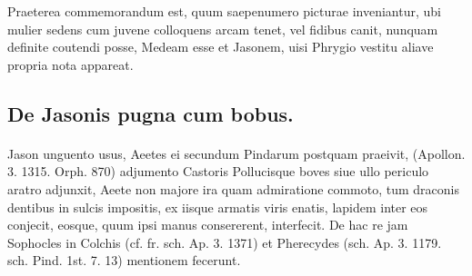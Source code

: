 \documentclass[landscape, a4paper, 11pt, oneside, polutonikogreek, german]{article}
\begin{document}
Praeterea commemorandum est, quum saepenumero picturae inveniantur, ubi mulier sedens cum juvene colloquens arcam tenet, vel fidibus canit, nunquam definite coutendi posse, Medeam esse et Jasonem, uisi Phrygio vestitu aliave propria nota appareat.

\subsection{De Jasonis pugna cum bobus.}
\paragraph{}
Jason unguento usus, Aeetes ei secundum Pindarum postquam praeivit, (Apollon. 3. 1315. Orph. 870) adjumento Castoris Pollucisque boves siue ullo periculo aratro adjunxit, Aeete non majore ira quam admiratione commoto, tum draconis dentibus in sulcis impositis, ex iisque armatis viris enatis, lapidem inter eos conjecit, eosque, quum ipsi manus consererent, interfecit. De hac re jam Sophocles in Colchis (cf. fr. sch. Ap. 3. 1371) et Pherecydes (sch. Ap. 3. 1179. sch. Pind. 1st. 7. 13) mentionem fecerunt.
\end{document}
